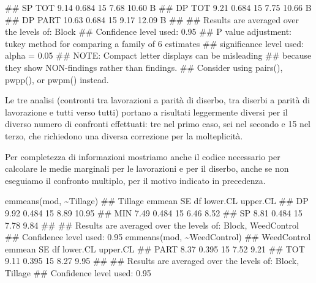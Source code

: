 \documentclass[a4paper,12pt,oneside]{book}
\newenvironment{Shaded}{\begin{snugshade}}{\end{snugshade}}
\newcommand{\SpecialCharTok}[1]{#1}
\newcommand{\DocumentationTok}[1]{#1}
\newcommand{\FunctionTok}[1]{#1}
\newcommand{\AlertTok}[1]{#1}
\newcommand{\NormalTok}[1]{#1}
\begin{document}
\begin{Shaded}
\begin{Highlighting}[]
\DocumentationTok{\#\#  SP      TOT           9.14 0.684 15     7.68    10.60   B   }
\DocumentationTok{\#\#  DP      TOT           9.21 0.684 15     7.75    10.66   B   }
\DocumentationTok{\#\#  DP      PART         10.63 0.684 15     9.17    12.09   B   }
\DocumentationTok{\#\# }
\DocumentationTok{\#\# Results are averaged over the levels of: Block }
\DocumentationTok{\#\# Confidence level used: 0.95 }
\DocumentationTok{\#\# P value adjustment: tukey method for comparing a family of 6 estimates }
\DocumentationTok{\#\# significance level used: alpha = 0.05 }
\DocumentationTok{\#\# }\AlertTok{NOTE}\DocumentationTok{: Compact letter displays can be misleading}
\DocumentationTok{\#\#       because they show NON{-}findings rather than findings.}
\DocumentationTok{\#\#       Consider using \textquotesingle{}pairs()\textquotesingle{}, \textquotesingle{}pwpp()\textquotesingle{}, or \textquotesingle{}pwpm()\textquotesingle{} instead.}
\end{Highlighting}
\end{Shaded}

Le tre analisi (contronti tra lavorazioni a parità di diserbo, tra diserbi a parità di lavorazione e tutti verso tutti) portano a risultati leggermente diversi per il diverso numero di confronti effettuati: tre nel primo caso, sei nel secondo e 15 nel terzo, che richiedono una diversa correzione per la molteplicità.

Per completezza di informazioni mostriamo anche il codice necessario per calcolare le medie marginali per le lavorazioni e per il diserbo, anche se non eseguiamo il confronto multiplo, per il motivo indicato in precedenza.

\begin{Shaded}
\begin{Highlighting}[]
\FunctionTok{emmeans}\NormalTok{(mod, }\SpecialCharTok{\textasciitilde{}}\NormalTok{Tillage)}
\DocumentationTok{\#\#  Tillage emmean    SE df lower.CL upper.CL}
\DocumentationTok{\#\#  DP        9.92 0.484 15     8.89    10.95}
\DocumentationTok{\#\#  MIN       7.49 0.484 15     6.46     8.52}
\DocumentationTok{\#\#  SP        8.81 0.484 15     7.78     9.84}
\DocumentationTok{\#\# }
\DocumentationTok{\#\# Results are averaged over the levels of: Block, WeedControl }
\DocumentationTok{\#\# Confidence level used: 0.95}
\FunctionTok{emmeans}\NormalTok{(mod, }\SpecialCharTok{\textasciitilde{}}\NormalTok{WeedControl)}
\DocumentationTok{\#\#  WeedControl emmean    SE df lower.CL upper.CL}
\DocumentationTok{\#\#  PART          8.37 0.395 15     7.52     9.21}
\DocumentationTok{\#\#  TOT           9.11 0.395 15     8.27     9.95}
\DocumentationTok{\#\# }
\DocumentationTok{\#\# Results are averaged over the levels of: Block, Tillage }
\DocumentationTok{\#\# Confidence level used: 0.95}
\end{Highlighting}
\end{Shaded}
\end{document}
